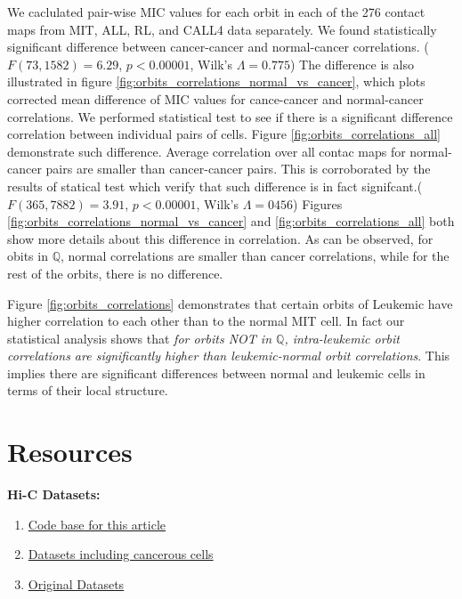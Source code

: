 \documentclass[a4,center,fleqn]{NAR}
\begin{document}
We caclulated pair-wise MIC values 
for each orbit in each of the 276
contact maps from MIT, ALL, RL, and CALL4 data separately. 
We found statistically significant difference between
cancer-cancer and normal-cancer correlations.
($F(73, 1582)=6.29$, $p < 0.00001$, Wilk's $\Lambda = 0.775$)
 The difference  is also illustrated in figure
\ref{fig:orbits_correlations_normal_vs_cancer},
which plots corrected
mean difference of MIC values for cance-cancer and 
normal-cancer correlations.  
We performed statistical test to see if there is a 
significant difference correlation between individual pairs
of cells. Figure \ref{fig:orbits_correlations_all} demonstrate
such difference.
Average correlation over all contac maps
for normal-cancer pairs are smaller
than cancer-cancer pairs. This is corroborated
by the results of statical test which verify that such difference
is in fact signifcant.($F(365, 7882) = 3.91$, $p < 0.00001$, 
Wilk's $\Lambda = 0456$)
Figures \ref{fig:orbits_correlations_normal_vs_cancer} and
\ref{fig:orbits_correlations_all} both show more details about
this difference in correlation. As can be observed, for obits
in $\mathbb{Q}$, normal correlations are smaller than cancer
correlations, while for the rest of the orbits, there is no
difference.

Figure \ref{fig:orbits_correlations} demonstrates that certain
orbits of Leukemic have higher correlation to each other 
than to the
normal MIT cell. In fact our statistical analysis shows that 
\textit {for orbits NOT in $\mathbb{Q}$, 
intra-leukemic orbit correlations are significantly higher
than leukemic-normal orbit correlations}. This implies
there are significant differences between normal and
leukemic cells in terms of their local structure.


\section{Resources}
\textbf{Hi-C Datasets:}
\begin{enumerate}
    \item \href{https://github.com/rasoolianbehnam/watson}{Code base for this article}
    \item \href{http://sysbio.rnet.missouri.edu/T0510/tmp_download/link_to_download_genome_data/}
        {Datasets including cancerous cells}
    \item \href{https://bcm.app.box.com/v/aidenlab/folder/11234760671}{Original Datasets}
\end{enumerate}



\end{document}
